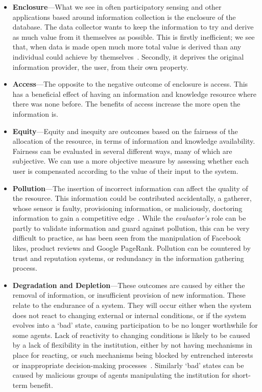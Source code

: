 \begin{itemize}

\item \textbf{Enclosure}---What we see in often participatory sensing and other applications based around information collection is the enclosure of the database. 
The data collector wants to keep the information to try and derive as much value from it themselves as possible. 
This is firstly inefficient; we see that, when data is made open much more total value is derived than any individual could achieve by themselves~\citep{Shadbolt2012}. 
Secondly, it deprives the original information provider, the user, from their own property. 

\item \textbf{Access}---The opposite to the negative outcome of enclosure is access. 
This has a beneficial effect of having an information and knowledge resource where there was none before. 
The benefits of access increase the more open the information is.

\item \textbf{Equity}---Equity and inequity are outcomes based on the fairness of the allocation of the resource, in terms of information and knowledge availability. Fairness can be evaluated in several different ways, many of which are subjective. We can use a more objective measure by assessing whether each user is compensated according to the value of their input to the system. 


\item \textbf{Pollution}---The insertion of incorrect information can affect the quality of the resource. 
This information could be contributed accidentally, \eg a gatherer, whose sensor is faulty, provisioning information, or maliciously, \eg doctoring information to gain a competitive edge~\citep{Oreskes2010}. While the \emph{evaluator's} role can be partly to validate information and guard against pollution, this can be very difficult to practice, as has been seen from the manipulation of Facebook likes, product reviews and Google PageRank. %
Pollution can be countered by trust and reputation systems, or redundancy in the information gathering process.

\item \textbf{Degradation and Depletion}---These outcomes are caused by either the removal of information, or insufficient provision of new information. 
These relate to the endurance of a system. They will occur either when the system does not react to changing external or internal conditions,  or if the system evolves into a `bad' state, causing participation to be no longer worthwhile for some agents. 
Lack of reactivity to changing conditions is likely to be caused by a lack of flexibility in the institution, either by not having mechanisms in place for reacting, or such mechanisms being blocked by entrenched interests or inappropriate decision-making processes~\citep{North1990}. 
Similarly `bad' states can be caused by malicious groups of agents manipulating the institution for short-term benefit.


\end{itemize}
